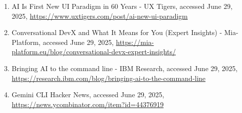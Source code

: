 \documentclass[a4paper,12pt]{article}
\begin{document}
\begin{multicols}{2}
\begin{enumerate}
    \item
      AI Is First New UI Paradigm in 60 Years - UX Tigers, accessed June
      29, 2025, \url{https://www.uxtigers.com/post/ai-new-ui-paradigm}\\
    \item
      Conversational DevX and What It Means for You (Expert Insights) -
      Mia-Platform, accessed June 29, 2025,
      \url{https://mia-platform.eu/blog/conversational-devx-expert-insights/}\\
    \item
      Bringing AI to the command line - IBM Research, accessed June 29,
      2025,
      \url{https://research.ibm.com/blog/bringing-ai-to-the-command-line}\\
    \item
      Gemini CLI \textbar{} Hacker News, accessed June 29, 2025,
      \url{https://news.ycombinator.com/item?id=44376919}
    \end{enumerate}

\end{multicols}
\end{document}
